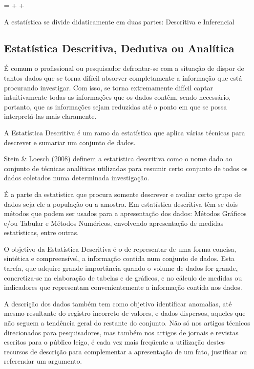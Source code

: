 \begin{center}
 =  +  + 
\end{center}

A estatística se divide didaticamente em duas partes: Descritiva e Inferencial


\subsection{Estatística Descritiva, Dedutiva ou Analítica}

\inic É comum o profissional ou pesquisador defrontar-se com a situação de dispor de tantos dados que se torna difícil absorver completamente a informação que está procurando investigar. Com isso, se torna extremamente difícil captar intuitivamente todas as informações que os dados contêm, sendo necessário, portanto, que as informações sejam reduzidas até o ponto em que se possa interpretá-las mais claramente.\vskip0.3cm

A Estatística Descritiva é um ramo da estatística que aplica várias técnicas para descrever e sumariar um conjunto de dados.\vskip0.3cm

Stein \& Loesch (2008) definem a estatística descritiva como o nome dado ao conjunto de técnicas analíticas utilizadas para resumir certo conjunto de todos os dados coletados numa determinada investigação.\vskip0.3cm


É a parte da estatística que procura somente descrever e avaliar certo grupo de dados seja ele a população ou a amostra. Em estatística descritiva têm-se dois métodos que podem ser usados para a apresentação dos dados: Métodos Gráficos e/ou Tabular e Métodos Numéricos, envolvendo apresentação de medidas estatísticas, entre outras.\vskip0.3cm


O objetivo da Estatística Descritiva é o de representar de uma forma concisa, sintética e compreensível, a informação contida num conjunto de dados. Esta tarefa, que adquire grande importância quando o volume de dados for grande, concretiza-se na elaboração de tabelas e de gráficos, e no cálculo de medidas ou indicadores que representam convenientemente a informação contida nos dados.\vskip0.3cm


 A descrição dos dados também tem como objetivo identificar anomalias, até mesmo resultante do registro incorreto de valores, e dados dispersos, aqueles que não seguem a tendência geral do restante do conjunto. Não só nos artigos técnicos direcionados para pesquisadores, mas também nos artigos de jornais e revistas escritos para o público leigo, é cada vez mais freqüente a utilização destes recursos de descrição para complementar a apresentação de um fato, justificar ou referendar um
 argumento.\vskip0.3cm

